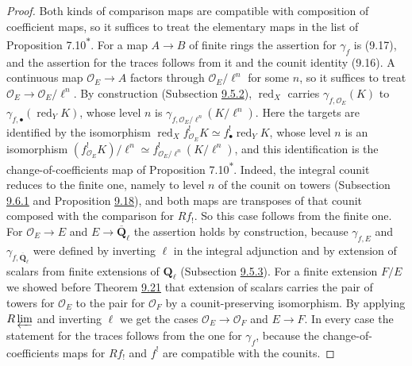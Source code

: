 \documentclass[11pt]{article}
\newcommand{\bpout}[1]{#1\textsuperscript{\hyperlink{bp-outside}{\ensuremath{\ast}}}}
\begin{document}
\begin{proof}[{Proof}]\label{bp93}%
Both kinds of comparison maps are compatible with composition of coefficient maps, so it suffices to treat the elementary maps in the list of Proposition \bpout{7.10}. For a map \(A\to B\) of finite rings the assertion for \(\gamma_f\) is (9.17), and the assertion for the traces follows from it and the counit identity (9.16). A continuous map \(\mathcal O_E\to A\) factors through \(\mathcal O_E/\ell^n\) for some \(n\), so it suffices to treat \(\mathcal O_E\to\mathcal O_E/\ell^n\). By construction (Subsection \hyperref[bp52]{9.5.2}), \(\operatorname{red}_X\) carries \(\gamma_{f,\mathcal O_E}(K)\) to \(\gamma_{f,\bullet}(\operatorname{red}_YK)\), whose level \(n\) is \(\gamma_{f,\mathcal O_E/\ell^n}(K/\ell^n)\). Here the targets are identified by the isomorphism \(\operatorname{red}_Xf^!_{\mathcal O_E}K\simeq f^!_\bullet\operatorname{red}_YK\), whose level \(n\) is an isomorphism \((f^!_{\mathcal O_E}K)/\ell^n\simeq f^!_{\mathcal O_E/\ell^n}(K/\ell^n)\), and this identification is the change-of-coefficients map of Proposition \bpout{7.10}. Indeed, the integral counit reduces to the finite one, namely to level \(n\) of the counit on towers (Subsection \hyperref[bp76]{9.6.1} and Proposition \hyperref[bp60]{9.18}), and both maps are transposes of that counit composed with the comparison for \(Rf_!\). So this case follows from the finite one. For \(\mathcal O_E\to E\) and \(E\to\overline{\mathbf Q}_\ell\) the assertion holds by construction, because \(\gamma_{f,E}\) and \(\gamma_{f,\overline{\mathbf Q}_\ell}\) were defined by inverting \(\ell\) in the integral adjunction and by extension of scalars from finite extensions of \(\mathbf Q_\ell\) (Subsection \hyperref[bp66]{9.5.3}). For a finite extension \(F/E\) we showed before Theorem \hyperref[bp71]{9.21} that extension of scalars carries the pair of towers for \(\mathcal O_E\) to the pair for \(\mathcal O_F\) by a counit-preserving isomorphism. By applying \(R\varprojlim\) and inverting \(\ell\) we get the cases \(\mathcal O_E\to\mathcal O_F\) and \(E\to F\). In every case the statement for the traces follows from the one for \(\gamma_f\), because the change-of-coefficients maps for \(Rf_!\) and \(f^!\) are compatible with the counits.
\end{proof}



\end{document}

